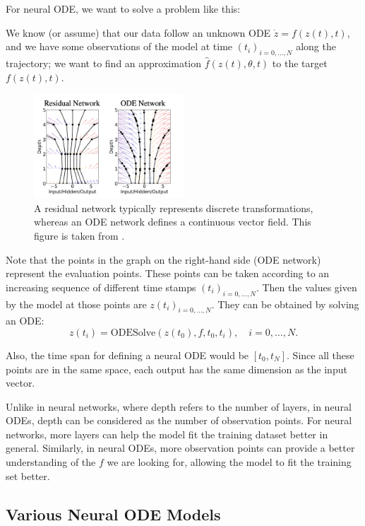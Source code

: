 \documentclass[a4paper,11pt,titlepage]{article}
\theoremstyle{definition}
\theoremstyle{plain}
\theoremstyle{remark}
\begin{document}
For neural ODE, we want to solve a problem like this: 

We know (or assume) that our data follow an unknown ODE $\dot{z}=f(z(t),t)$, and we have some observations of the model at time $(t_i)_{i=0,\dots,N}$ along the trajectory; we want to find an approximation $\hat{f}(z(t),\theta,t)$ to the target $f(z(t),t)$.

\begin{figure}[htbp]
    \centering
    \includegraphics[width=0.5\textwidth]{report/figures/ResNetvsODENet.png}
    \caption{A residual network typically represents discrete transformations, whereas an ODE network defines a continuous vector field. This figure is taken from \cite{chen2018neural}.}
    \label{fig:enter-label}
\end{figure}

Note that the points in the graph on the right-hand side (ODE network) represent the evaluation points. These points can be taken according to an increasing sequence of different time stamps $(t_i)_{i=0,\dots,N}$. Then the values given by the model at those points are $z(t_i)_{i=0,\dots,N}$. They can be obtained by solving an ODE:
$$z(t_i)=\mathrm{ODESolve}(z(t_0),f,t_0,t_i),\quad i=0,\dots,N.$$

Also, the time span for defining a neural ODE would be $[t_0,t_N]$. Since all these points are in the same space, each output has the same dimension as the input vector.

Unlike in neural networks, where depth refers to the number of layers, in neural ODEs, depth can be considered as the number of observation points. For neural networks, more layers can help the model fit the training dataset better in general. Similarly, in neural ODEs, more observation points can provide a better understanding of the $f$ we are looking for, allowing the model to fit the training set better.

\subsection{Various Neural ODE Models}
\end{document}
